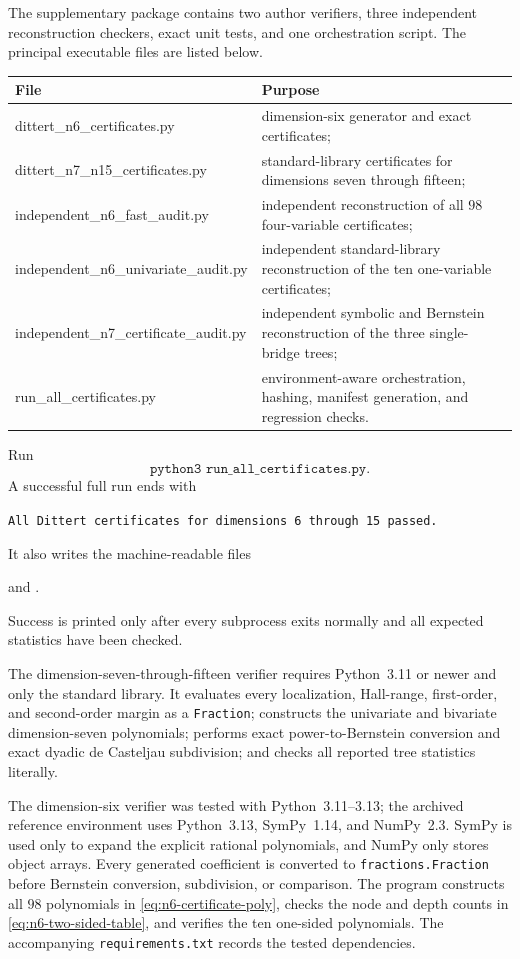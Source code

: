 \documentclass[11pt,a4paper]{article}
\numberwithin{equation}{section}
\theoremstyle{definition}
\newcommand{\1}{\mathbf{1}}
\begin{document}
The supplementary package contains two author verifiers, three
independent reconstruction checkers, exact unit tests, and one orchestration
script.  The principal executable files are listed below.
\begin{center}
\small
\begin{tabularx}{\textwidth}{@{}>{\ttfamily}l Y@{}}
\toprule
\normalfont File & Purpose \\
\midrule
dittert\_n6\_certificates.py
 & dimension-six generator and exact certificates; \\
dittert\_n7\_n15\_certificates.py
 & standard-library certificates for dimensions seven through fifteen; \\
independent\_n6\_fast\_audit.py
 & independent reconstruction of all $98$ four-variable certificates; \\
independent\_n6\_univariate\_audit.py
 & independent standard-library reconstruction of the ten one-variable certificates; \\
independent\_n7\_certificate\_audit.py
 & independent symbolic and Bernstein reconstruction of the three single-bridge trees; \\
run\_all\_certificates.py
 & environment-aware orchestration, hashing, manifest generation, and regression checks. \\
\bottomrule
\end{tabularx}
\end{center}
Run
\[
 \texttt{python3 run\_all\_certificates.py}.
\]
A successful full run ends with
\begin{center}
\texttt{All Dittert certificates for dimensions 6 through 15 passed.}
\end{center}
It also writes the machine-readable files
\begin{center}
\quad and\quad
{}.
\end{center}
Success is printed only after every subprocess exits normally and all
expected statistics have been checked.

The dimension-seven-through-fifteen verifier requires Python~3.11 or newer
and only the standard library.  It evaluates every localization, Hall-range,
first-order, and second-order margin as a \texttt{Fraction}; constructs the
univariate and bivariate dimension-seven polynomials; performs exact
power-to-Bernstein conversion and exact dyadic de Casteljau subdivision; and
checks all reported tree statistics literally.

The dimension-six verifier was tested with Python~3.11--3.13; the archived
reference environment uses Python~3.13, SymPy~1.14, and NumPy~2.3.  SymPy is used only to expand the explicit rational polynomials,
and NumPy only stores object arrays.  Every generated coefficient is
converted to \texttt{fractions.Fraction} before Bernstein conversion,
subdivision, or comparison.  The program constructs all $98$ polynomials in
\eqref{eq:n6-certificate-poly}, checks the node and depth counts in
\eqref{eq:n6-two-sided-table}, and verifies the ten one-sided polynomials.
The accompanying \texttt{requirements.txt} records the tested dependencies.
\end{document}
